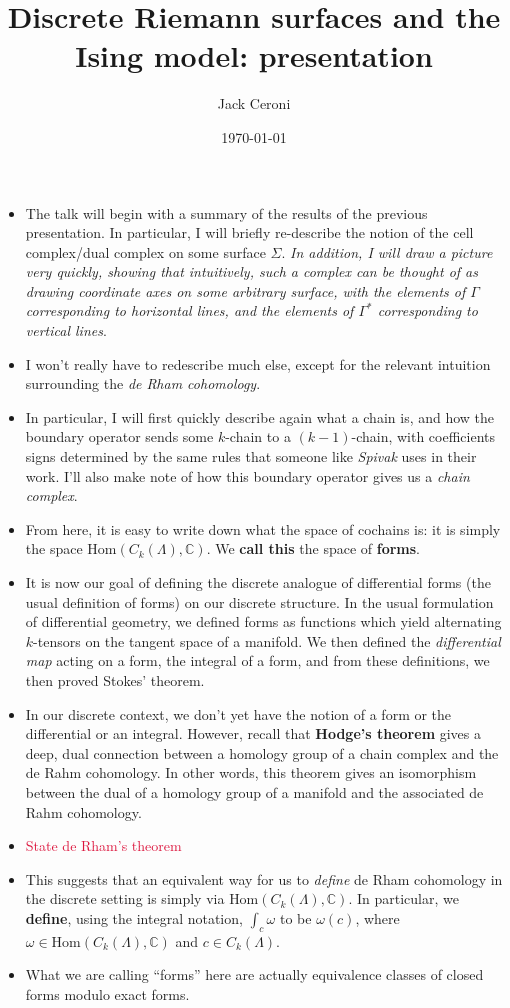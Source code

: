\documentclass[aps,pra,showpacs,notitlepage,onecolumn,superscriptaddress,nofootinbib]{revtex4-1}
\newcommand{\pop}[1]{\textcolor{crimson}{#1}}
\theoremstyle{definition}
\begin{document}
\title{Discrete Riemann surfaces and the Ising model: presentation}
\author{Jack Ceroni}

\date{\today}

\maketitle

\begin{itemize}
\item The talk will begin with a summary of the results of the previous presentation. In particular, I will briefly re-describe the notion of the cell complex/dual complex
  on some surface $\Sigma$. \emph{In addition, I will draw a picture very quickly, showing that intuitively, such a complex can be thought of as drawing coordinate axes on some arbitrary surface,
  with the elements of $\Gamma$ corresponding to horizontal lines, and the elements of $\Gamma^{*}$ corresponding to vertical lines}.
\item I won't really have to redescribe much else, except for the relevant intuition surrounding the \emph{de Rham cohomology}.
\item In particular, I will first quickly describe again what a chain is, and how the boundary operator sends some $k$-chain to a $(k - 1)$-chain, with coefficients signs
  determined by the same rules that someone like \emph{Spivak} uses in their work. I'll also make note of how this boundary operator gives us a \emph{chain complex}.
\item From here, it is easy to write down what the space of cochains is: it is simply the space $\text{Hom}(C_k(\Lambda), \mathbb{C})$. We \textbf{call this} the space of \textbf{forms}.
\item It is now our goal of defining the discrete analogue of differential forms (the usual definition of forms) on our discrete structure. In the usual formulation of differential geometry,
  we defined forms as functions which yield alternating $k$-tensors on the tangent space of a manifold. We then defined the \emph{differential map}
  acting on a form, the integral of a form, and from these definitions, we then proved Stokes' theorem.
\item In our discrete context, we don't yet have the notion of a form or the differential or an integral. However, recall that \textbf{Hodge's theorem} gives a deep, dual connection between a homology group of
  a chain complex and the de Rahm cohomology. In other words, this theorem gives an isomorphism between the dual of a homology group of a manifold and the associated de Rahm cohomology.
\item \pop{State de Rham's theorem}
\item This suggests that an equivalent way for us to \emph{define} de Rham cohomology in the discrete setting is simply via $\text{Hom}(C_k(\Lambda), \mathbb{C})$. In particular,
  we \textbf{define}, using the integral notation, $\int_{c} \omega$ to be $\omega(c)$, where $\omega \in \text{Hom}(C_k(\Lambda), \mathbb{C})$ and $c \in C_k(\Lambda)$.
  \item What we are calling ``forms'' here are actually equivalence classes of closed forms modulo exact forms.
  \end{itemize}
\end{document}
